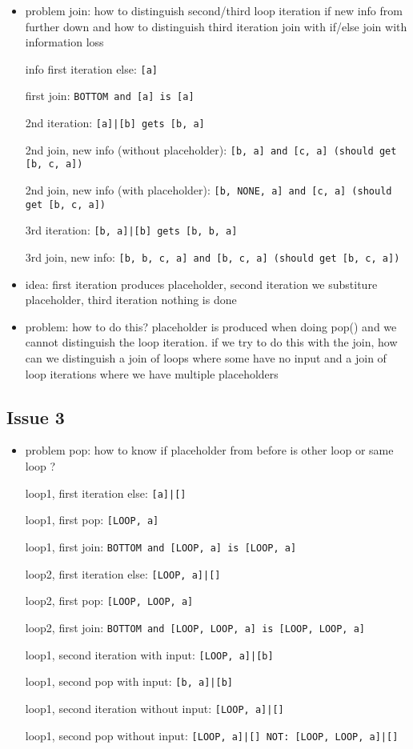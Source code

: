 \documentclass[11pt]{article}
\begin{document}
\begin{itemize}
\item problem join: how to distinguish second/third loop iteration if new info from further down and how to distinguish third iteration join with if/else join with information loss

info first iteration else: \verb/[a]/

first join: \verb/BOTTOM and [a] is [a]/

2nd iteration: \verb/[a]|[b] gets [b, a]/

2nd join, new info (without placeholder): \verb/[b, a] and [c, a] (should get [b, c, a])/

2nd join, new info (with placeholder): \verb/[b, NONE, a] and [c, a] (should get [b, c, a])/

3rd iteration: \verb/[b, a]|[b] gets [b, b, a]/

3rd join, new info: \verb/[b, b, c, a] and [b, c, a] (should get [b, c, a])/

\item idea: first iteration produces placeholder, second iteration we substiture placeholder, third iteration nothing is done
\item problem: how to do this? placeholder is produced when doing pop() and we cannot distinguish the loop iteration. if we try to do this with the join, how can we distinguish a join of loops where some have no input and a join of loop iterations where we have multiple placeholders
\end{itemize}

\subsection{Issue 3}

\begin{itemize}
\item problem pop: how to know if placeholder from before is other loop or same loop ?

loop1, first iteration else: \verb/[a]|[]/

loop1, first pop: \verb/[LOOP, a]/

loop1, first join: \verb/BOTTOM and [LOOP, a] is [LOOP, a]/

loop2, first iteration else: \verb/[LOOP, a]|[]/

loop2, first pop: \verb/[LOOP, LOOP, a]/

loop2, first join: \verb/BOTTOM and [LOOP, LOOP, a] is [LOOP, LOOP, a]/

loop1, second iteration with input: \verb/[LOOP, a]|[b]/

loop1, second pop with input: \verb/[b, a]|[b]/

loop1, second iteration without input: \verb/[LOOP, a]|[]/

loop1, second pop without input: \verb/[LOOP, a]|[] NOT: [LOOP, LOOP, a]|[]/

\end{itemize}
\end{document}
